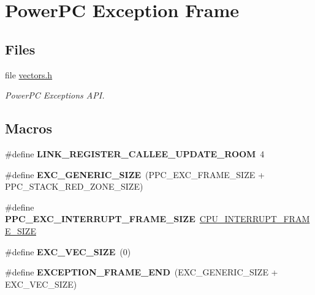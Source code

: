 \hypertarget{group__ppc__exc__frame}{}\section{Power\+PC Exception Frame}
\label{group__ppc__exc__frame}
\subsection*{Files}
\begin{DoxyCompactItemize}
\item 
file \mbox{\hyperlink{bsp_2vectors_8h}{vectors.\+h}}
\begin{DoxyCompactList}\small\item\em Power\+PC Exceptions A\+PI. \end{DoxyCompactList}\end{DoxyCompactItemize}
\subsection*{Macros}
\begin{DoxyCompactItemize}
\item 
\mbox{\label{group__ppc__exc__frame_ga5a3c5f29721d21b3fafe38fbff747fa3}} 
\#define {\bfseries L\+I\+N\+K\+\_\+\+R\+E\+G\+I\+S\+T\+E\+R\+\_\+\+C\+A\+L\+L\+E\+E\+\_\+\+U\+P\+D\+A\+T\+E\+\_\+\+R\+O\+OM}~4
\item 
\mbox{\label{group__ppc__exc__frame_gabb23f0ddd489ff65809efd74ca6d74b5}} 
\#define {\bfseries E\+X\+C\+\_\+\+G\+E\+N\+E\+R\+I\+C\+\_\+\+S\+I\+ZE}~(P\+P\+C\+\_\+\+E\+X\+C\+\_\+\+F\+R\+A\+M\+E\+\_\+\+S\+I\+ZE + P\+P\+C\+\_\+\+S\+T\+A\+C\+K\+\_\+\+R\+E\+D\+\_\+\+Z\+O\+N\+E\+\_\+\+S\+I\+ZE)
\item 
\mbox{\label{group__ppc__exc__frame_gafc77218d39609bc2adc89dd219fab9ed}} 
\#define {\bfseries P\+P\+C\+\_\+\+E\+X\+C\+\_\+\+I\+N\+T\+E\+R\+R\+U\+P\+T\+\_\+\+F\+R\+A\+M\+E\+\_\+\+S\+I\+ZE}~\mbox{\hyperlink{group__RTEMSScoreCPUSPARC_gac17ddadf3ff0907a3beefb6d72b1563f}{C\+P\+U\+\_\+\+I\+N\+T\+E\+R\+R\+U\+P\+T\+\_\+\+F\+R\+A\+M\+E\+\_\+\+S\+I\+ZE}}
\item 
\mbox{\label{group__ppc__exc__frame_ga55b8272c9fefb3bc4314d3e69f1eb293}} 
\#define {\bfseries E\+X\+C\+\_\+\+V\+E\+C\+\_\+\+S\+I\+ZE}~(0)
\item 
\mbox{\label{group__ppc__exc__frame_gaeb84a19a8ee30fea89d6d3f075119228}} 
\#define {\bfseries E\+X\+C\+E\+P\+T\+I\+O\+N\+\_\+\+F\+R\+A\+M\+E\+\_\+\+E\+ND}~(E\+X\+C\+\_\+\+G\+E\+N\+E\+R\+I\+C\+\_\+\+S\+I\+ZE + E\+X\+C\+\_\+\+V\+E\+C\+\_\+\+S\+I\+ZE)
\end{DoxyCompactItemize}
